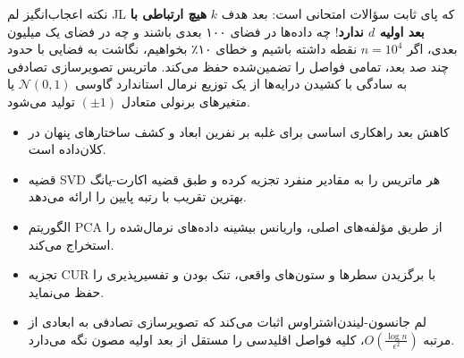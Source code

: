 \begin{examnote}
نکته اعجاب‌انگیز لم JL که پای ثابت سؤالات امتحانی است:
بعد هدف $k$ \textbf{هیچ ارتباطی با بعد اولیه $d$ ندارد}!
چه داده‌ها در فضای ۱۰۰ بعدی باشند و چه در فضای یک میلیون بعدی، اگر $n = 10^4$ نقطه داشته باشیم و خطای ۱۰٪ بخواهیم، نگاشت به فضایی با حدود چند صد بعد، تمامی فواصل را تضمین‌شده حفظ می‌کند.
ماتریس تصویرسازی تصادفی به سادگی با کشیدن درایه‌ها از یک توزیع نرمال استاندارد گاوسی $\mathcal{N}(0, 1)$ یا متغیرهای برنولی متعادل $(\pm 1)$ تولید می‌شود.
\end{examnote}

\begin{summarybox}
\begin{itemize}
    \item کاهش بعد راهکاری اساسی برای غلبه بر نفرین ابعاد و کشف ساختارهای پنهان در کلان‌داده است.
    \item قضیه SVD هر ماتریس را به مقادیر منفرد تجزیه کرده و طبق قضیه اکارت-یانگ بهترین تقریب با رتبه پایین را ارائه می‌دهد.
    \item الگوریتم PCA از طریق مؤلفه‌های اصلی، واریانس بیشینه داده‌های نرمال‌شده را استخراج می‌کند.
    \item تجزیه CUR با برگزیدن سطرها و ستون‌های واقعی، تنک بودن و تفسیرپذیری را حفظ می‌نماید.
    \item لم جانسون-لیندن‌اشتراوس اثبات می‌کند که تصویرسازی تصادفی به ابعادی از مرتبه $O(\frac{\log n}{\epsilon^2})$، کلیه فواصل اقلیدسی را مستقل از بعد اولیه مصون نگه می‌دارد.
\end{itemize}
\end{summarybox}
